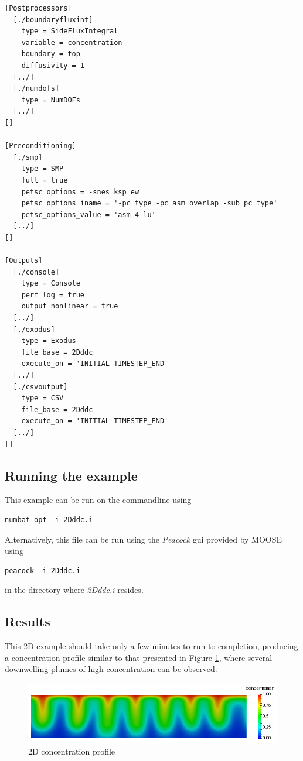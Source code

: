 \begin{verbatim}
[Postprocessors]
  [./boundaryfluxint]
    type = SideFluxIntegral
    variable = concentration
    boundary = top
    diffusivity = 1
  [../]
  [./numdofs]
    type = NumDOFs
  [../]
[]

[Preconditioning]
  [./smp]
    type = SMP
    full = true
    petsc_options = -snes_ksp_ew
    petsc_options_iname = '-pc_type -pc_asm_overlap -sub_pc_type'
    petsc_options_value = 'asm 4 lu'
  [../]
[]

[Outputs]
  [./console]
    type = Console
    perf_log = true
    output_nonlinear = true
  [../]
  [./exodus]
    type = Exodus
    file_base = 2Dddc
    execute_on = 'INITIAL TIMESTEP_END'
  [../]
  [./csvoutput]
    type = CSV
    file_base = 2Dddc
    execute_on = 'INITIAL TIMESTEP_END'
  [../]
[]
\end{verbatim}

\subsection{Running the example}\label{running-the-example}

This example can be run on the commandline using

\begin{verbatim}
numbat-opt -i 2Dddc.i
\end{verbatim}

Alternatively, this file can be run using the \emph{Peacock} gui
provided by MOOSE using

\begin{verbatim}
peacock -i 2Dddc.i
\end{verbatim}

in the directory where \emph{2Dddc.i} resides.

\subsection{Results}\label{results}

This 2D example should take only a few minutes to run to completion,
producing a concentration profile similar to that presented in Figure
\ref{fig:2D}, where several downwelling plumes of high concentration can
be observed:

\begin{figure}[htbp]
\centering
\includegraphics{images/2D.png}
\caption{2D concentration profile\label{fig:2D}}
\end{figure}

